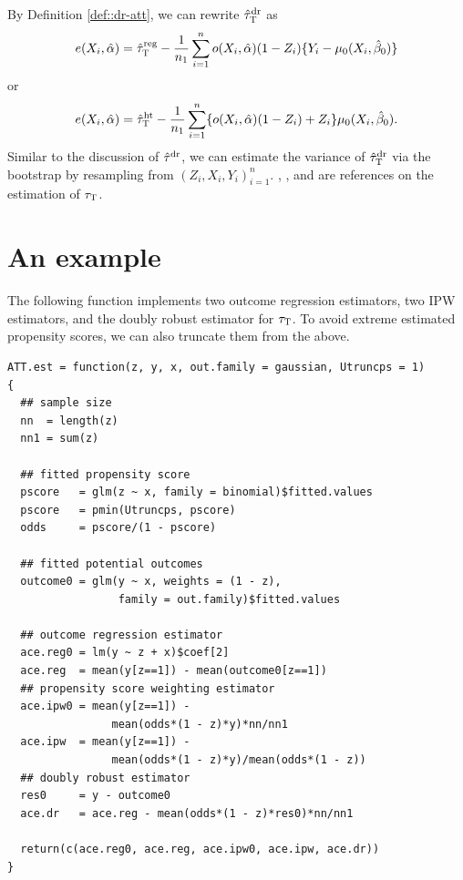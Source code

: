 By Definition \ref{def::dr-att}, we can rewrite $\hat{\tau}_\textsc{T}^\textup{dr}$ as
$$
e(X_i, \hat{\alpha})
= \hat{\tau}_\textsc{T}^\textup{reg}
 - \frac{1}{n_1} \sum_{i=1}^n  o(X_i,\hat{\alpha})  (1-Z_i)\{ Y_i-\mu_0(X_i, \hat{\beta}_0) \}    
$$
or
$$
e(X_i, \hat{\alpha})
= \hat{\tau}_\textsc{T}^\textup{ht} 
- \frac{1}{n_1} \sum_{i=1}^n  \{ o(X_i,\hat{\alpha}) (1-Z_i) + Z_i  \} \mu_0(X_i, \hat{\beta}_0)  .
$$
Similar to the discussion of $\hat{\tau}^\textup{dr}  $, we can  estimate the  variance of $\hat{\tau}_\textsc{T}^\textup{dr}  $  via the bootstrap by resampling from $(Z_i, X_i, Y_i)_{i=1}^n$. 
\citet{hahn1998role}, \citet{mercatanti2014debit}, \citet{shinozaki2015brief} and \citet{yang2018asymptotic} are references on the estimation of $\tau_\textsc{T}$. 



\section{An example}
\label{sec::dr-att-example}


The following  function implements two outcome regression estimators, two IPW estimators, and the doubly robust estimator for $\tau_\textsc{T}$. To avoid extreme estimated propensity scores, we can also truncate them from the above. 

\begin{lstlisting}
ATT.est = function(z, y, x, out.family = gaussian, Utruncps = 1)
{
  ## sample size
  nn  = length(z)
  nn1 = sum(z)
  
  ## fitted propensity score
  pscore   = glm(z ~ x, family = binomial)$fitted.values
  pscore   = pmin(Utruncps, pscore)
  odds     = pscore/(1 - pscore)
  
  ## fitted potential outcomes
  outcome0 = glm(y ~ x, weights = (1 - z), 
                 family = out.family)$fitted.values
  
  ## outcome regression estimator
  ace.reg0 = lm(y ~ z + x)$coef[2]
  ace.reg  = mean(y[z==1]) - mean(outcome0[z==1]) 
  ## propensity score weighting estimator
  ace.ipw0 = mean(y[z==1]) - 
                mean(odds*(1 - z)*y)*nn/nn1
  ace.ipw  = mean(y[z==1]) - 
                mean(odds*(1 - z)*y)/mean(odds*(1 - z))
  ## doubly robust estimator
  res0     = y - outcome0
  ace.dr   = ace.reg - mean(odds*(1 - z)*res0)*nn/nn1
  
  return(c(ace.reg0, ace.reg, ace.ipw0, ace.ipw, ace.dr))     
}
\end{lstlisting}

